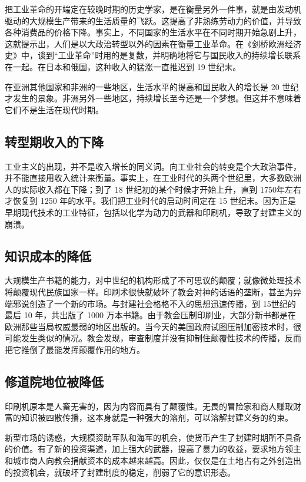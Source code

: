 把工业革命的开端定在较晚时期的历史学家，是在衡量另外一件事，就是由发动机驱动的大规模生产带来的生活质量的飞跃。这提高了非熟练劳动力的价值，并导致各种消费品的价格下降。事实上，不同国家的生活水平在不同时期开始急剧上升，这就提示出，人们是以大政治转型以外的因素在衡量工业革命。在《剑桥欧洲经济史》中，谈到“工业革命”时用的是复数，并明确地将它与国民收入的持续增长联系在一起。在日本和俄国，这种收入的猛涨一直推迟到 19 世纪末。

在亚洲其他国家和非洲的一些地区，生活水平的提高和国民收入的增长是 20 世纪才发生的景象。非洲另外一些地区，持续增长至今还是一个梦想。但这并不意味着它们不是生活在现代时期。

\subsection{转型期收入的下降}
工业主义的出现，并不是收入增长的同义词。向工业社会的转变是个大政治事件，并不能直接用收入统计来衡量。事实上，在工业时代的头两个世纪里，大多数欧洲人的实际收入都在下降；到了 18 世纪初的某个时候才开始上升，直到 1750年左右才恢复到 1250 年的水平。我们把工业时代的启动时间定在 15 世纪末。因为正是早期现代技术的工业特征，包括以化学为动力的武器和印刷机，导致了封建主义的崩溃。

\subsection{知识成本的降低}
大规模生产书籍的能力，对中世纪的机构形成了不可思议的颠覆；就像微处理技术将颠覆现代民族国家一样。印刷术很快就破坏了教会对神的话语的垄断，甚至为异端邪说创造了一个新的市场。与封建社会格格不入的思想迅速传播，到 15世纪的最后 10 年，共出版了 1000 万本书籍。由于教会压制印刷业，大部分新书都是在欧洲那些当局权威最弱的地区出版的。当今天的美国政府试图压制加密技术时，很可能发生类似的情况。教会发现，审查制度并没有抑制住颠覆性技术的传播，反而把它推倒了最能发挥颠覆作用的地方。

\subsection{修道院地位被降低}
印刷机原本是人畜无害的，因为内容而具有了颠覆性。无畏的冒险家和商人赚取财富的知识被四散传播，这本身就是一种强大的溶剂，可以溶解封建义务的约束。

新型市场的诱惑，大规模资助军队和海军的机会，使货币产生了封建时期所不具备的价值。有了新的投资渠道，加上强大的武器，提高了暴力的收益，要求地方领主和城市商人向教会捐献资本的成本越来越高。因此，仅仅是在土地占有之外创造出的投资机会，就破坏了封建制度的稳定，削弱了它的意识形态。

